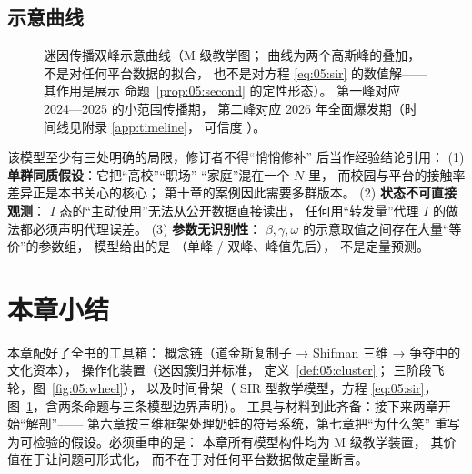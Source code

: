 \subsection{示意曲线}

\begin{figure}[htbp]\centering
{}
  \caption{迷因传播双峰示意曲线（M 级教学图；
曲线为两个高斯峰的叠加，不是对任何平台数据的拟合，
 也不是对方程 \eqref{eq:05:sir} 的数值解——
 其作用是展示 命题~\ref{prop:05:second} 的定性形态）。
 第一峰对应 2024—2025 的小范围传播期，
 第二峰对应 2026 年全面爆发期（时间线见附录 \ref{app:timeline}，
 可信度 ）。}
  \label{fig:05:sir}
\end{figure}

\begin{nlcritique}
该模型至少有三处明确的局限，修订者不得“悄悄修补”
后当作经验结论引用： (1) \textbf{单群同质假设}：它把“高校”“职场”
 “家庭”混在一个 $N$ 里，
 而校园与平台的接触率差异正是本书关心的核心；
 第十章的案例因此需要多群版本。 (2) \textbf{状态不可直接观测}：
 $I$ 态的“主动使用”无法从公开数据直接读出，
 任何用“转发量”代理 $I$ 的做法都必须声明代理误差。
 (3) \textbf{参数无识别性}：
 $\beta,\gamma,\omega$ 的示意取值之间存在大量“等价”的参数组，
 模型给出的是  （单峰 / 双峰、峰值先后），
 不是定量预测。
\end{nlcritique}

\section{本章小结}\label{sec:05:summary}

本章配好了全书的工具箱：
 概念链（道金斯复制子 → Shifman 三维 → 争夺中的文化资本），
 操作化装置（迷因簇归并标准， 定义~\ref{def:05:cluster}；
 三阶段飞轮，图~\ref{fig:05:wheel}），
 以及时间骨架（ SIR 型教学模型，方程 \eqref{eq:05:sir}，
 图~\ref{fig:05:sir}，含两条命题与三条模型边界声明）。
 工具与材料到此齐备：接下来两章开始“解剖”——
 第六章按三维框架处理奶蛙的符号系统，第七章把“为什么笑”
 重写为可检验的假设。必须重申的是：
 本章所有模型构件均为 M 级教学装置，
 其价值在于让问题可形式化，
 而不在于对任何平台数据做定量断言。

